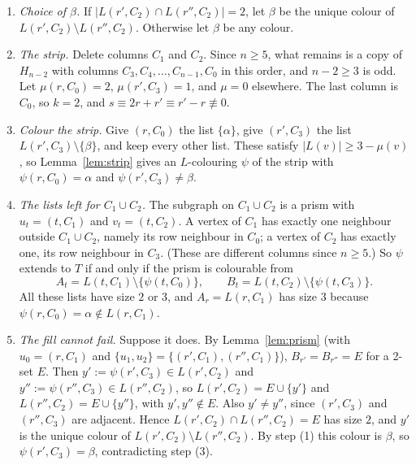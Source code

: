 \documentclass[11pt]{article}
\theoremstyle{plain}
\theoremstyle{definition}
\theoremstyle{remark}
\newenvironment{steps}{\begin{enumerate}[label=(\arabic*),leftmargin=2.2em,itemsep=0.35em]}{\end{enumerate}}
\begin{document}
\begin{steps}
\item \emph{Choice of $\beta$.} If $|L(r', C_2) \cap L(r'', C_2)| = 2$, let $\beta$ be the unique
colour of $L(r', C_2) \setminus L(r'', C_2)$. Otherwise let $\beta$ be any colour.

\item \emph{The strip.} Delete columns $C_1$ and $C_2$. Since $n \ge 5$, what remains is a copy
of $H_{n-2}$ with columns $C_3, C_4, \dots, C_{n-1}, C_0$ in this order, and $n - 2 \ge 3$ is odd.
Let $\mu(r, C_0) = 2$, $\mu(r', C_3) = 1$, and $\mu = 0$ elsewhere. The last column is $C_0$, so
$k = 2$, and $s \equiv 2r + r' \equiv r' - r \not\equiv 0$.

\item \emph{Colour the strip.} Give $(r, C_0)$ the list $\{\alpha\}$, give $(r', C_3)$ the list
$L(r', C_3) \setminus \{\beta\}$, and keep every other list. These satisfy $|L(v)| \ge 3 -
\mu(v)$, so Lemma~\ref{lem:strip} gives an $L$-colouring $\psi$ of the strip with
$\psi(r, C_0) = \alpha$ and $\psi(r', C_3) \ne \beta$.

\item \emph{The lists left for $C_1 \cup C_2$.} The subgraph on $C_1 \cup C_2$ is a prism with
$u_t = (t, C_1)$ and $v_t = (t, C_2)$. A vertex of $C_1$ has exactly one neighbour outside
$C_1 \cup C_2$, namely its row neighbour in $C_0$; a vertex of $C_2$ has exactly one, its row
neighbour in $C_3$. (These are different columns since $n \ge 5$.) So $\psi$ extends to $T$ if and
only if the prism is colourable from
\[
A_t = L(t, C_1) \setminus \{\psi(t, C_0)\}, \qquad B_t = L(t, C_2) \setminus \{\psi(t, C_3)\}.
\]
All these lists have size $2$ or $3$, and $A_r = L(r, C_1)$ has size $3$ because
$\psi(r, C_0) = \alpha \notin L(r, C_1)$.

\item \emph{The fill cannot fail.} Suppose it does. By Lemma~\ref{lem:prism} (with $u_0 = (r,
C_1)$ and $\{u_1, u_2\} = \{(r', C_1), (r'', C_1)\}$), $B_{r'} = B_{r''} = E$ for a 2-set $E$.
Then $y' := \psi(r', C_3) \in L(r', C_2)$ and $y'' := \psi(r'', C_3) \in L(r'', C_2)$, so
$L(r', C_2) = E \cup \{y'\}$ and $L(r'', C_2) = E \cup \{y''\}$, with $y', y'' \notin E$. Also
$y' \ne y''$, since $(r', C_3)$ and $(r'', C_3)$ are adjacent. Hence $L(r', C_2) \cap L(r'',
C_2) = E$ has size $2$, and $y'$ is the unique colour of $L(r', C_2) \setminus L(r'', C_2)$. By
step (1) this colour is $\beta$, so $\psi(r', C_3) = \beta$, contradicting step (3).
\end{steps}
\end{document}
